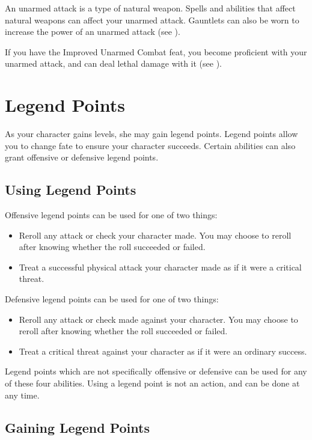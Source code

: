 An unarmed attack is a type of natural weapon.
Spells and abilities that affect natural weapons can affect your unarmed attack.
Gauntlets can also be worn to increase the power of an unarmed attack (see ).

If you have the Improved Unarmed Combat feat, you become proficient with your unarmed attack, and can deal lethal damage with it (see ).
\section{Legend Points}\label{Legend Points}

As your character gains levels, she may gain legend points.
Legend points allow you to change fate to ensure your character succeeds.
Certain abilities can also grant offensive or defensive legend points.

\subsection{Using Legend Points}

Offensive legend points can be used for one of two things:
\begin{itemize}
    \item Reroll any attack or check your character made.
        You may choose to reroll after knowing whether the roll succeeded or failed.
    \item Treat a successful physical attack your character made as if it were a critical threat.
\end{itemize}

Defensive legend points can be used for one of two things:
\begin{itemize}
    \item Reroll any attack or check made against your character.
        You may choose to reroll after knowing whether the roll succeeded or failed.
    \item Treat a critical threat against your character as if it were an ordinary success.
\end{itemize}

Legend points which are not specifically offensive or defensive can be used for any of these four abilities.
Using a legend point is not an action, and can be done at any time.

\subsection{Gaining Legend Points}

